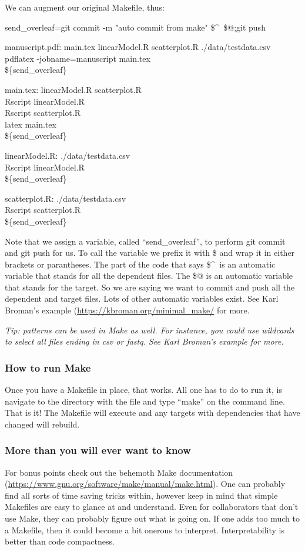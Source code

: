 \documentclass{article}
\begin{document}
We can augment our original Makefile, thus:

send\_overleaf=git commit -m "auto commit from make" \$\textasciicircum\ \$$@$;git push

manuscript.pdf: main.tex linearModel.R scatterplot.R ./data/testdata.csv\\
\tab pdflatex -jobname=manuscript main.tex\\
\tab \$\{send\_overleaf\}

main.tex: linearModel.R scatterplot.R\\
\tab Rscript linearModel.R\\
\tab Rscript scatterplot.R\\
\tab latex main.tex\\
\tab \$\{send\_overleaf\}

linearModel.R: ./data/testdata.csv\\
\tab Rscript linearModel.R\\
\tab \$\{send\_overleaf\}

scatterplot.R: ./data/testdata.csv\\
\tab Rscript scatterplot.R\\
\tab \$\{send\_overleaf\}

Note that we assign a variable, called ``send\_overleaf'', to perform git commit and git push for us. To call the variable we prefix it with \$ and wrap it in either brackets or parantheses. The part of the code that says \$\textasciicircum\ is an automatic variable that stands for all the dependent files. The \$$@$ is an automatic variable that stands for the target. So we are saying we want to commit and push all the dependent and target files. Lots of other automatic variables exist. See Karl Broman's example (\url{https://kbroman.org/minimal_make/} for more.

\emph{Tip: patterns can be used in {\sf Make} as well. For instance, you could use wildcards to select all files ending in csv or fastq. See Karl Broman's example for more.}

\subsubsection{How to run {\sf Make}}

Once you have a Makefile in place, that works. All one has to do to run it, is navigate to the directory with the file and type ``make'' on the command line. That is it! The Makefile will execute and any targets with dependencies that have changed will rebuild. 

\subsubsection{More than you will ever want to know}

For bonus points check out the behemoth {\sf Make} documentation (\url{https://www.gnu.org/software/make/manual/make.html}). One can probably find all sorts of time saving tricks within, however keep in mind that simple Makefiles are easy to glance at and understand. Even for collaborators that don't use {\sf Make}, they can probably figure out what is going on. If one adds too much to a Makefile, then it could become a bit onerous to interpret. Interpretability is better than code compactness.
\end{document}
